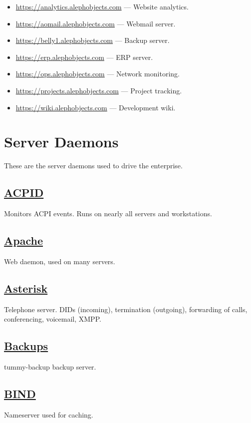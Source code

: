 \begin{itemize}
\item \url{https://analytics.alephobjects.com} --- Website analytics.
\item \url{https://aomail.alephobjects.com} --- Webmail server.
\item \url{https://belly1.alephobjects.com} --- Backup server.
\item \url{https://erp.alephobjects.com} --- ERP server.
\item \url{https://ops.alephobjects.com} --- Network monitoring.
\item \url{https://projects.alephobjects.com} --- Project tracking.
\item \url{https://wiki.alephobjects.com} --- Development wiki.
\end{itemize}

\section{Server Daemons}
These are the server daemons used to drive the enterprise.

\subsection{\href{http://sourceforge.net/projects/acpid2/}{ACPID}}
Monitors ACPI events. Runs on nearly all servers and workstations.

\subsection{\href{http://httpd.apache.org/}{Apache}}
Web daemon, used on many servers.

\subsection{\href{http://www.asterisk.org}{Asterisk}}
Telephone server. DIDs (incoming), termination (outgoing), forwarding of calls, conferencing,
voicemail, XMPP.

\subsection{\href{https://github.com/tummy-dot-com/tummy-backup}{Backups}}
tummy-backup backup server.

\subsection{\href{http://www.isc.org/}{BIND}}
Nameserver used for caching.

